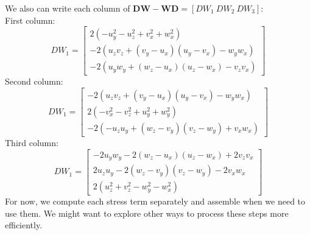 We also can write each column of ${\bm{DW}} - {\bm{WD}} = \left[ DW_1 \ DW_2 \ DW_3  \right]$:
\\
First column:
\[
DW_1 = 
\begin{bmatrix}
    2 \left(- u_{y}^2-u_{z}^2  + v_{x}^2 + w_{x}^2\right)
    \\
    -2 \left(u_{z} v_{z}+\left(v_{y}-u_{x}\right) \left(u_{y}-v_{x}\right)-w_{y} w_{x}\right)
    \\
    -2 
    \left(
    u_{y} w_{y}+ \left(w_{z}-u_{x}\right) \left(u_{z}-w_{x}\right)- v_{z} v_{x}
    \right)
\end{bmatrix}
\]
Second column:
\[
DW_1 = 
\begin{bmatrix}
    -2 \left(u_{z} v_{z}+\left(v_{y}-u_{x}\right) \left(u_{y}-v_{x}\right)-w_{y} w_{x}\right)
    \\
    2 \left(- v_{x}^2 - v_{z}^2 +u_{y}^2 + w_{y}^2\right)
    \\
    -2 
    \left(
    -u_{z} u_{y}+ \left(w_{z}-v_{y}\right) \left(v_{z}-w_{y}\right)+ v_{x} w_{x}
    \right)
\end{bmatrix}
\]
Third column:
\[
DW_1 = 
\begin{bmatrix}
   -2 u_{y} w_{y}-2 \left(w_{z}-u_{x}\right) \left(u_{z}-w_{x}\right)+2 v_{z} v_{x}
   \\
   2 u_{z} u_{y}-2 \left(w_{z}-v_{y}\right) \left(v_{z}-w_{y}\right)-2 v_{x} w_{x}
   \\
   2 \left(u_{z}^2+v_{z}^2-w_{y}^2-w_{x}^2\right)
\end{bmatrix}
\]
For now, we compute each stress term separately and assemble when we need to use them. We might want to explore other ways to process these steps more efficiently. 
